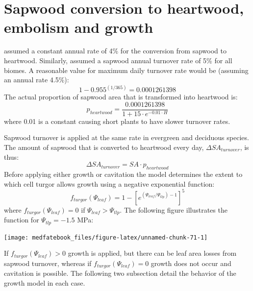 \documentclass[]{book}
\begin{document}
\hypertarget{sapwood-conversion-to-heartwood-embolism-and-growth-1}{%
\section{Sapwood conversion to heartwood, embolism and growth}\label{sapwood-conversion-to-heartwood-embolism-and-growth-1}}

\citet{Prentice1993} assumed a constant annual rate of 4\% for the conversion from sapwood to heartwood. Similarly, \citet{Sitch2003} assumed a sapwood annual turnover rate of 5\% for all biomes. A reasonable value for maximum daily turnover rate would be (assuming an annual rate 4.5\%):
\begin{equation}
1-0.955^{(1/365)} = 0.0001261398
\end{equation}
The actual proportion of sapwood area that is transformed into heartwood is:
\begin{equation}
p_{heartwood} = \frac{0.0001261398}{1+15\cdot e^{-0.01\cdot H}}
\end{equation}
where 0.01 is a constant causing short plants to have slower turnover rates.

Sapwood turnover is applied at the same rate in evergreen and deciduous species. The amount of sapwood that is converted to heartwood every day, \(\Delta SA_{turnover}\), is thus:
\begin{equation}
\Delta SA_{turnover} = SA \cdot p_{heartwood}
\end{equation}
Before applying either growth or cavitation the model determines the extent to which cell turgor allows growth using a negative exponential function:
\begin{equation}
f_{turgor}(\Psi_{leaf}) = 1 - \left[e^{(\Psi_{leaf}/\Psi_{tlp})-1}\right]^5
\end{equation}
where \(f_{turgor}(\Psi_{leaf})=0\) if \(\Psi_{leaf} > \Psi_{tlp}\). The following figure illustrates the function for \(\Psi_{tlp}=-1.5\) MPa:

\begin{center}\texttt{[image: medfatebook\_files/figure-latex/unnamed-chunk-71-1]} \end{center}

If \(f_{turgor}(\Psi_{leaf})>0\) growth is applied, but there can be leaf area losses from sapwood turnover, whereas if \(f_{turgor}(\Psi_{leaf}) = 0\) growth does not occur and cavitation is possible. The following two subsection detail the behavior of the growth model in each case.
\end{document}
